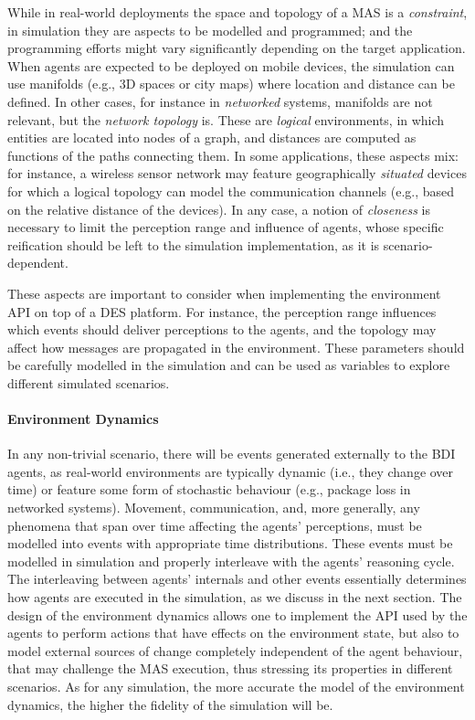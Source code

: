 While in real-world deployments the space and topology of a \ac{MAS} is a \emph{constraint},
in simulation they are aspects to be modelled and programmed;
and the programming efforts might vary significantly depending on the target application.
%
When agents are expected to be deployed on mobile devices,
the simulation can use manifolds
(e.g., 3D spaces or city maps)
where location and distance can be defined.
%
In other cases,
for instance in \emph{networked} systems,
manifolds are not relevant,
but the \emph{network topology} is.
%
These are \emph{logical} environments,
in which entities are located into nodes of a graph,
and distances are computed as functions of the paths connecting them.
%
In some applications,
these aspects mix:
for instance,
a wireless sensor network may feature geographically \emph{situated} devices
for which a logical topology can model the communication channels
(e.g., based on the relative distance of the devices).
%
In any case,
a notion of \emph{closeness} is necessary
to limit the perception range and influence of agents,
whose specific reification
should be left to the simulation implementation,
as it
is scenario-dependent.

These aspects are important to consider when implementing the environment \ac{API}
on top of a \ac{DES} platform.
For instance, the perception range influences which events
should deliver perceptions to the agents,
and the topology may affect how messages are propagated in the environment.
%
These parameters should be carefully modelled in the simulation
and can be used as variables to explore different simulated scenarios.


\paragraph{Environment Dynamics}

In any non-trivial scenario,
there will be events generated externally to the \ac{BDI} agents,
as real-world environments are typically dynamic
(i.e., they change over time)
or feature some form of stochastic behaviour
(e.g., package loss in networked systems).
%
Movement,
communication,
and, more generally,
any phenomena that span over time affecting the agents' perceptions,
must be modelled into events with appropriate time distributions.
%
These events must be modelled in simulation
and properly interleave with the agents' reasoning cycle.
%
The interleaving between agents' internals and other events
essentially determines how agents are executed in the simulation,
as we discuss in the next section.
%
The design of the environment dynamics
allows one to implement the \ac{API} used by the agents to
perform actions that have effects on the environment state,
but also to model external sources of change
completely independent of the agent behaviour,
that may challenge the \ac{MAS} execution,
thus stressing its properties
in different scenarios.
%
As for any simulation, the more accurate the model of the environment dynamics,
the higher the fidelity of the simulation will be.

